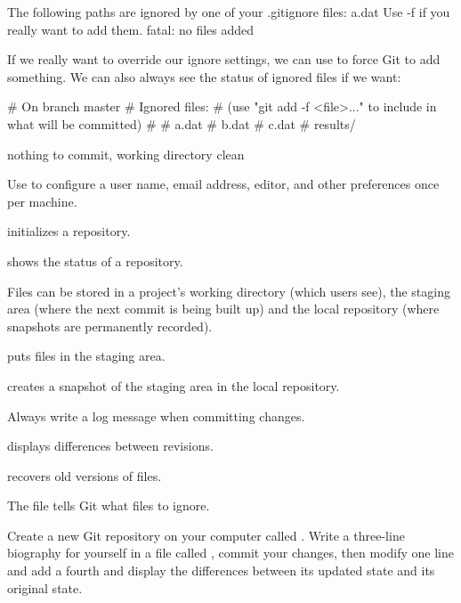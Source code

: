 \begin{VerbOut}
The following paths are ignored by one of your .gitignore files:
a.dat
Use -f if you really want to add them.
fatal: no files added
\end{VerbOut}

If we really want to override our ignore settings, we can use
 to force Git to add something. We can also always
see the status of ignored files if we want:


\begin{VerbOut}
# On branch master
# Ignored files:
#  (use "git add -f <file>..." to include in what will be committed)
#
#        a.dat
#        b.dat
#        c.dat
#        results/

nothing to commit, working directory clean
\end{VerbOut}

\begin{keypoints}
\begin{swcitemize}
\item
  Use  to configure a user name, email address,
  editor, and other preferences once per machine.
\item
   initializes a repository.
\item
   shows the status of a repository.
\item
  Files can be stored in a project's working directory (which users
  see), the staging area (where the next commit is being built up) and
  the local repository (where snapshots are permanently recorded).
\item
   puts files in the staging area.
\item
   creates a snapshot of the staging area in the
  local repository.
\item
  Always write a log message when committing changes.
\item
   displays differences between revisions.
\item
   recovers old versions of files.
\item
  The  file tells Git what files to ignore.
\end{swcitemize}
\end{keypoints}

\begin{challenge}
  Create a new Git repository on your computer called .
  Write a three-line biography for yourself in a file called
  , commit your changes, then modify one line and add a
  fourth and display the differences between its updated state and its
  original state.
\end{challenge}

